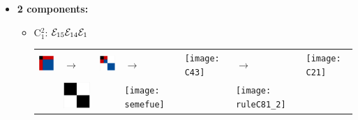 \begin{itemize}
\item \textbf{2 components:}\newline
\begin{itemize}
\item C$_1^2$: $\mathcal{E}_{15}\mathcal{E}_{14}\mathcal{E}_1$\newline
\begin{tabular}{m{2cm} m{2cm} m{2cm} m{2cm} m{2cm} m{2cm} m{2cm}}
\includegraphics[width=2.2cm]{img-JA/id}  
& \hspace{0.8cm}$\longrightarrow$ 
& \includegraphics[width=2.2cm]{img-JA/8comp} 
& \hspace{0.8cm}$\longrightarrow$ 
& \texttt{[image: C43]}
& \hspace{0.8cm}$\longrightarrow$ 
& \texttt{[image: C21]}\\ 
 & \includegraphics[width=2.2cm]{img-JA/16To8} &  
 & \texttt{[image: semefue]} &
 & \texttt{[image: ruleC81\_2]} &\\ 
\end{tabular} 


\end{itemize}
\end{itemize}
